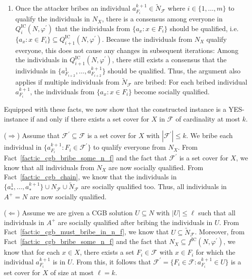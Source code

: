 \documentclass[
    12pt,               %
    a4paper,            %
    bibtotoc,           %
    pointlessnumbers,   %
    ngerman,            %
    titlepage,          %
    leqno,              %
    ]{scrarticle}       %
\newcommand\factref{Fact~\ref}
\begin{document}
\begin{Proof}
\begin{enumerate}[
    topsep=-4pt,
    leftmargin=*,
    itemindent=4.96em,
    label={\textit{Fact \ref*{thm:ic_cgb_npc}.\arabic*}:},
    ref={\ref*{thm:ic_cgb_npc}.\arabic*}
]
\item \label{fact:ic_cgb_bribe_some_n_f}
Once the attacker bribes an individual $a^{k+1}_{F_i} \in \tilde{N}_\mathcal{F}$ where $i \in \{ 1, \ldots, m \}$ to qualify the individuals in $N_X$, there is a consensus among everyone in $Q^{\text{IC}}_i(N, \varphi^\prime)$ that the individuals from $\{ a_x : x \in F_i \}$ should be qualified, i.e.\@ $\{ a_x : x \in F_i \} \subseteq Q^{\text{IC}}_{i+1}(N, \varphi^\prime)$. Because the individuals from $N_X$ qualify everyone, this does not cause any changes in subsequent iterations: Among the individuals in $Q^{\text{IC}}_{i+1}(N, \varphi^\prime)$, there still exists a consensus that the individuals in $\{ a^1_{F_{i+2}}, \ldots, a^{k+1}_{F_{i+2}} \}$ should be qualified. Thus, the argument also applies if multiple individuals from $\tilde{N}_\mathcal{F}$ are bribed: For each bribed individual $a^{k+1}_{F_i}$, the individuals from $\{ a_x : x \in F_i \}$ become socially qualified.
\end{enumerate}



Equipped with these facts, we now show that the constructed instance is a YES-instance if and only if there exists a set cover for $X$ in $\mathcal{F}$ of cardinality at most $k$.

($\Rightarrow$) Assume that $\mathcal{F}^\prime \subseteq \mathcal{F}$ is a set cover for $X$ with $|\mathcal{F}^\prime| \leq k$. We bribe each individual in $\{ a^{k+1}_{F_i} : {F_i} \in \mathcal{F}^\prime \}$ to qualify everyone from $N_X$. From \factref{fact:ic_cgb_bribe_some_n_f} and the fact that $\mathcal{F}^\prime$ is a set cover for $X$, we know that all individuals from $N_X$ are now socially qualified. From \factref{fact:ic_cgb_chain}, we know that the individuals in $\{ a^1_\ast, \ldots, a^{k+1}_\ast \} \cup N_\mathcal{F} \cup \tilde{N}_\mathcal{F}$ are socially qualified too. Thus, all individuals in $A^+ = N$ are now socially qualified.

($\Leftarrow$) Assume we are given a CGB solution $U \subseteq N$ with $|U| \leq \ell$ such that all individuals in $A^+$ are socially qualified after bribing the individuals in $U$. From \factref{fact:ic_cgb_must_bribe_in_n_f}, we know that $U \subseteq \tilde{N}_\mathcal{F}$. Moreover, from \factref{fact:ic_cgb_bribe_some_n_f} and the fact that $N_X \subseteq f^{\text{IC}}(N, \varphi^\prime)$, we know that for each $x \in X$, there exists a set $F_i \in \mathcal{F}$ with $x \in F_i$ for which the individual $a^{k+1}_{F_i}$ is in $U$. From this, it follows that $\mathcal{F}^\prime = \{ F_i \in \mathcal{F} : a^{k+1}_{F_i} \in U \}$ is a set cover for $X$ of size at most $\ell = k$.
\end{Proof}
\end{document}
